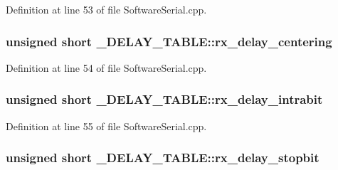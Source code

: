 \-Definition at line 53 of file \-Software\-Serial.\-cpp.

\hypertarget{struct___d_e_l_a_y___t_a_b_l_e_a51aab1d8b68a8ea27646618a30b0e938}{
\subsubsection[{rx\-\_\-delay\-\_\-centering}]{\setlength{\rightskip}{0pt plus 5cm}unsigned short {\bf \-\_\-\-D\-E\-L\-A\-Y\-\_\-\-T\-A\-B\-L\-E\-::rx\-\_\-delay\-\_\-centering}}}\label{struct___d_e_l_a_y___t_a_b_l_e_a51aab1d8b68a8ea27646618a30b0e938}


\-Definition at line 54 of file \-Software\-Serial.\-cpp.

\hypertarget{struct___d_e_l_a_y___t_a_b_l_e_a8b81bfff2b179bdc4b6cd2f57df74e8f}{
\subsubsection[{rx\-\_\-delay\-\_\-intrabit}]{\setlength{\rightskip}{0pt plus 5cm}unsigned short {\bf \-\_\-\-D\-E\-L\-A\-Y\-\_\-\-T\-A\-B\-L\-E\-::rx\-\_\-delay\-\_\-intrabit}}}\label{struct___d_e_l_a_y___t_a_b_l_e_a8b81bfff2b179bdc4b6cd2f57df74e8f}


\-Definition at line 55 of file \-Software\-Serial.\-cpp.

\hypertarget{struct___d_e_l_a_y___t_a_b_l_e_a459c08839bc23ed1e22b146f7f3ce13d}{
\subsubsection[{rx\-\_\-delay\-\_\-stopbit}]{\setlength{\rightskip}{0pt plus 5cm}unsigned short {\bf \-\_\-\-D\-E\-L\-A\-Y\-\_\-\-T\-A\-B\-L\-E\-::rx\-\_\-delay\-\_\-stopbit}}}\label{struct___d_e_l_a_y___t_a_b_l_e_a459c08839bc23ed1e22b146f7f3ce13d}


